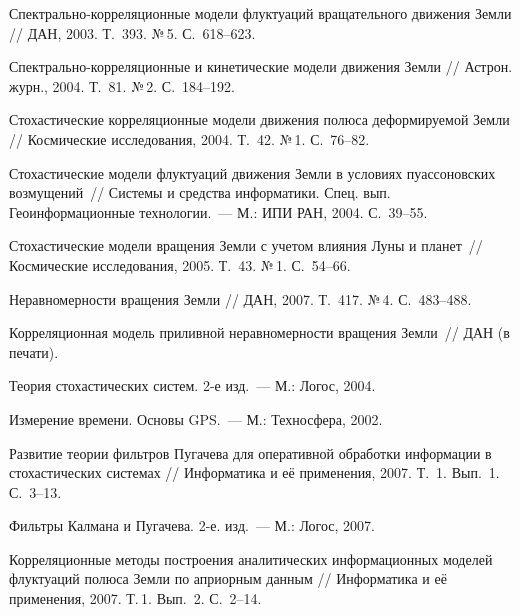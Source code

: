 \begin{multicols}{2}
{{\begin{thebibliography}{99}
Спектрально-кор\-ре\-ля\-ци\-он\-ные модели флуктуаций вращательного движения Земли //
ДАН, 2003. Т.~393. №\,5. С.~618--623.

Спектрально-кор\-ре\-ля\-ци\-он\-ные и кинетические модели движения Земли //
Астрон. журн., 2004. Т.~81. №\,2. С.~184--192.

Стохастические корреляционные модели движения полюса деформируемой Земли //
Космические исследования, 2004. Т.~42. №\,1. С.~76--82.

Стохастические модели флуктуаций движения Земли в условиях пуассоновских
возмущений~// Системы и средства информатики.
Спец. вып. Геоинформационные технологии.~--- М.: ИПИ РАН, 2004. С.~39--55.

Стохастические модели вращения Земли с учетом влияния Луны и планет~//
Космические исследования, 2005. Т.~43. №\,1. С.~54--66.

Неравномерности вращения Земли //
ДАН, 2007. Т.~417. №\,4. С.~483--488.

Корреляционная модель приливной неравномерности вращения Земли~//
ДАН  (в печати).

Теория стохастических систем. 2-е изд.~--- М.: Логос, 2004.

Измерение времени. Основы GPS.~--- М.: Техносфера, 2002.

Развитие теории фильтров Пугачева для оперативной обработки информации
в стохастических системах //
Информатика и её применения, 2007. Т.~1. Вып.~1. С.~3--13.

Фильтры Калмана и Пугачева. 2-е. изд.~--- М.: Логос, 2007.

Корреляционные методы построения аналитических информационных моделей
флуктуаций полюса Земли по априорным данным //
Информатика и её применения, 2007. Т.\,1. Вып.~2. С.~2--14.

\label{end\stat}
\end{thebibliography}
 }
}
\end{multicols}